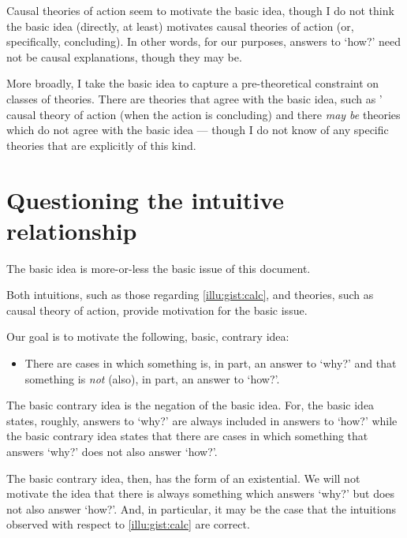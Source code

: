 \begin{note}
  Causal theories of action seem to motivate the basic idea, though I do not think the basic idea (directly, at least) motivates causal theories of action (or, specifically, concluding).
  In other words, for our purposes, answers to `how?' need not be causal explanations, though they may be.

  More broadly, I take the basic idea to capture a pre-theoretical constraint on classes of theories.
  There are theories that agree with the basic idea, such as \citeauthor{Davidson:1963aa}' causal theory of action (when the action is concluding) and there \emph{may be} theories which do not agree with the basic idea --- though I do not know of any specific theories that are explicitly of this kind.
\end{note}

\section{Questioning the intuitive relationship}

\begin{note}
  The basic idea is more-or-less the basic issue of this document.

  Both intuitions, such as those regarding \autoref{illu:gist:calc}, and theories, such as \citeauthor{Davidson:1963aa} causal theory of action, provide motivation for the basic issue.

  Our goal is to motivate the following, basic, contrary idea:

  \begin{itemize}
  \item
    There are cases in which something is, in part, an answer to `why?' and that something is \emph{not} (also), in part, an answer to `how?'.
  \end{itemize}

  The basic contrary idea is the negation of the basic idea.
  For, the basic idea states, roughly, answers to `why?' are always included in answers to `how?' while the basic contrary idea states that there are cases in which something that answers `why?' does not also answer `how?'.

  The basic contrary idea, then, has the form of an existential.
  We will not motivate the idea that there is always something which answers `why?' but does not also answer `how?'.
  And, in particular, it may be the case that the intuitions observed with respect to \autoref{illu:gist:calc} are correct.
\end{note}

